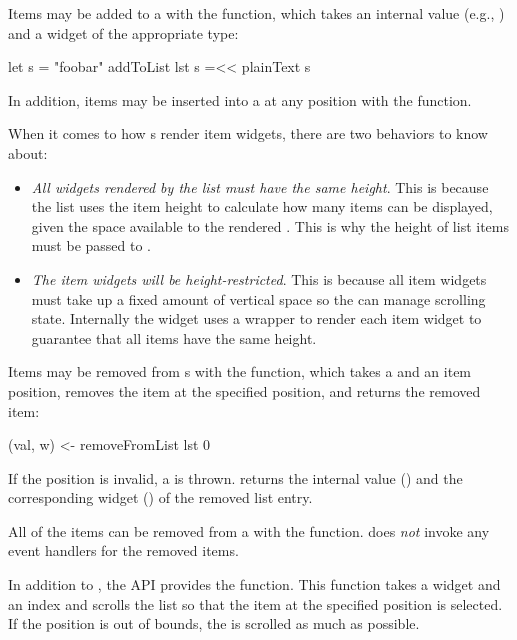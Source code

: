 Items may be added to a  with the  function,
which takes an internal value (e.g., ) and a widget of the
appropriate type:

\begin{haskellcode}
 let s = "foobar"
 addToList lst s =<< plainText s
\end{haskellcode}

In addition, items may be inserted into a  at any position with
the  function.

When it comes to how s render item widgets, there are two behaviors to
know about:

\begin{itemize}
\item \textit{All widgets rendered by the list must have the same height}.
  This is because the list uses the item height to calculate how many
  items can be displayed, given the space available to the rendered .
  This is why the height of list items must be passed to .
\item \textit{The item widgets will be height-restricted}.  This is because all
   item widgets must take up a fixed amount of vertical space so the
   can manage scrolling state.  Internally the  widget uses a
   wrapper to render each item widget to guarantee that all items
  have the same height.
\end{itemize}

Items may be removed from s with the 
function, which takes a  and an item position,
removes the item at the specified position, and returns the removed
item:

\begin{haskellcode}
 (val, w) <- removeFromList lst 0
\end{haskellcode}

If the position is invalid, a  is thrown.
 returns the internal value () and the
corresponding widget () of the removed list entry.

All of the items can be removed from a  with the
 function.   does \textit{not} invoke any
event handlers for the removed items.

In addition to , the  API provides the
 function.  This function takes a  widget and
an index and scrolls the list so that the item at the specified
position is selected.  If the position is out of bounds, the 
is scrolled as much as possible.

